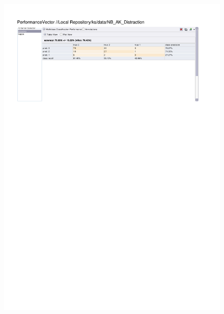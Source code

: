 \begin{figure}[htp]
  \centerline{\includegraphics[trim=0 680 0 60,clip,width=16.09cm]{results/NB_A_Distraction.pdf}} \caption{
} \label{NB_K_Distraction}
\end{figure}

